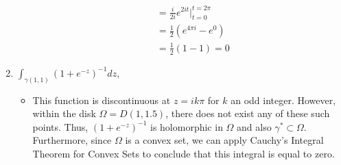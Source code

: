 \documentclass[10pt,a4paper]{article}
\theoremstyle{definition}
\begin{document}
\begin{enumerate}[label = (\alph*)]
\begin{itemize}
\begin{align*}
	&= \frac{i}{2i} e^{2it} \bigg|_{t = 0}^{t = 2\pi}\\
	&= \frac{1}{2}\left(e^{4\pi i} - e^0\right)\\
	&= \frac{1}{2}(1 - 1) = 0
	\end{align*}
	\end{itemize}
\item $\displaystyle \int_{\gamma(1,1)} (1 + e^{-z})^{-1} dz$,
	\begin{itemize}
	\item This function is discontinuous at $z = ik\pi$ for $k$ an odd integer. However, within the disk $\Omega = D(1,1.5)$, there does not exist any of these such points. Thus, $(1 + e^{-z})^{-1}$ is holomorphic in $\Omega$ and also $\gamma^* \subset \Omega$. Furthermore, since $\Omega$ is a convex set, we can apply Cauchy's Integral Theorem for Convex Sets to conclude that this integral is equal to zero. 
	\end{itemize}
\end{enumerate}
\end{document}
